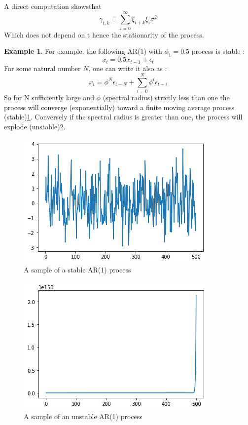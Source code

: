 \documentclass{article}
\theoremstyle{definition}
\newtheorem{ex}{Example}[section]
\begin{document}
A direct computation showsthat 
\begin{equation}\label{ACF_MA}
    \gamma_{t,k}=\sum_{i=0}^{\infty}\xi_{i+k}\xi_{i}\sigma^{2}
\end{equation}
Which does not depend on t hence the stationarity of the process. 
\begin{ex}
For example, the following AR($1$) with $\phi_1=0.5$ process is stable :  \begin{equation*}
    x_t=0.5x_{t-1}+\epsilon_t
\end{equation*}
For some natural number $N$, one can write it also as :
\begin{equation*}
    x_t=\phi^N\epsilon_{t-N}+\sum_{i=0}^N\phi^i\epsilon_{t-i}
\end{equation*}
So for N sufficiently large and $\phi$ (spectral radius) strictly less than one the process will converge (exponentially) toward a finite moving average process (stable)\ref{fig:AR(1)_stable_sample}. Conversely if the spectral radius is greater than one, the process will explode (unstable)\ref{fig:AR(1)_unstable_sample}.
\end{ex}
\begin{figure}
    \includegraphics[width=\textwidth]{AR(1)_stable.png}
    \caption{A sample of a stable AR(1) process}
    \label{fig:AR(1)_stable_sample}
\end{figure}
\begin{figure}
    \includegraphics[width=\textwidth]{AR(1)_unstable.png}
    \caption{A sample of an unstable AR(1) process}
    \label{fig:AR(1)_unstable_sample}
\end{figure}
\end{document}
